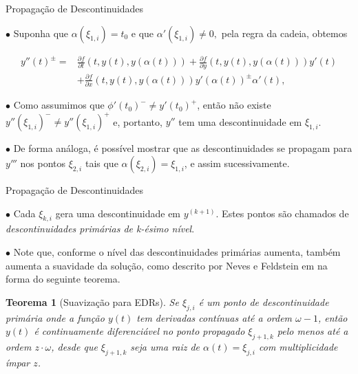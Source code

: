 \documentclass{beamer}
\theoremstyle{plain}
\newtheorem{teo}{Teorema}
\theoremstyle{definition}
\begin{document}

\begin{frame}{Propagação de Descontinuidades}

    $\bullet$ Suponha que $\alpha(\xi_{1, i}) = t_0 $ e que $ \alpha'(\xi_{1, i}) \neq 0, $ pela regra da cadeia, obtemos

    \begin{equation}
        \begin{aligned}
            y''(t)^{ \pm}= & \frac{\partial f}{\partial t}(t, y(t), y(\alpha(t)))+\frac{\partial f}{\partial y}(t, y(t), y(\alpha(t))) y'(t) \\
                           & +\frac{\partial f}{\partial x}(t, y(t), y(\alpha(t))) y'(\alpha(t))^{ \pm} \alpha'(t),
        \end{aligned}
        \label{chap2:eq:EDR:chain_rule}
    \end{equation}

    $\bullet$ Como assumimos que \(\phi'(t_{0})^{-} \neq y'(t_{0})^{+}\), então não existe \(y''(\xi_{1, i})^- \neq y''(\xi_{1, i})^+\) e, portanto, $y''$ tem uma descontinuidade em $\xi_{1, i}$.

    $\bullet$ De forma análoga, é possível mostrar que as descontinuidades se propagam para $y'''$ nos pontos $\xi_{2, i}$ tais que $\alpha(\xi_{2, i}) = \xi_{1, i}$, e assim sucessivamente. 

\end{frame}



\begin{frame}{Propagação de Descontinuidades}

    $\bullet$ Cada $\xi_{k, i}$ gera uma descontinuidade em $y^{(k+1)}$. Estes pontos são chamados de \textit{descontinuidades primárias de k-ésimo nível}.

    $\bullet$ Note que, conforme o nível das descontinuidades primárias aumenta, também aumenta a suavidade da solução, como descrito por Neves e Feldstein em \cite{Neves1976CharacterizationOJ} na forma do seguinte teorema.


    \begin{teo}[Suavização para EDRs]
        \label{chap2:teo:EDR_smooting}
        Se \(\xi_{j, i}\) é um ponto de descontinuidade primária onde a função \(y(t)\) tem derivadas contínuas até a ordem \(\omega-1\), então \(y(t)\) é continuamente diferenciável no ponto propagado \(\xi_{j+1, k}\) pelo menos até a ordem \(z \cdot \omega\), desde que \(\xi_{j+1, k}\) seja uma raiz de \(\alpha(t) = \xi_{j, i}\) com multiplicidade ímpar \(z\).
    \end{teo}

\end{frame}
\end{document}
